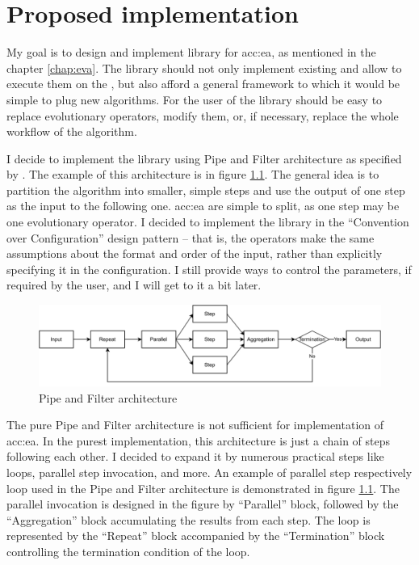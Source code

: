 \chapter{Proposed implementation}
\label{chap:impl}

My goal is to design and implement library for \acrlong{acc:ea}, as mentioned in the chapter \ref{chap:eva}. The library should not only implement existing  and allow to execute them on the \gpuns, but also afford a general framework to which it would be simple to plug new algorithms. For the user of the library should be easy to replace evolutionary operators, modify them, or, if necessary, replace the whole workflow of the algorithm.

I decide to implement the library using Pipe and Filter architecture as specified by \citet{EnterpriseIntegrationPatterns}. The example of this architecture is in figure \ref{fig:pipesandfilters}. The general idea is to partition the algorithm into smaller, simple steps and use the output of one step as the input to the following one. \acrshort{acc:ea} are simple to split, as one step may be one evolutionary operator. I decided to implement the library in the \enquote{Convention over Configuration} design pattern -- that is, the operators make the same assumptions about the format and order of the input, rather than explicitly specifying it in the configuration. I still provide ways to control the parameters, if required by the user, and I will get to it a bit later.

\begin{figure}
    \centering
    \includegraphics[width=\textwidth]{img/PipesAndFilters.pdf}
    \caption{Pipe and Filter architecture}
    \label{fig:pipesandfilters}
\end{figure}

The pure Pipe and Filter architecture is not sufficient for implementation of \acrshort{acc:ea}. In the purest implementation, this architecture is just a chain of steps following each other. I decided to expand it by numerous practical steps like loops, parallel step invocation, and more. An example of parallel step respectively loop used in the Pipe and Filter architecture is demonstrated in figure \ref{fig:pipesandfilters}. The parallel invocation is designed in the figure by \enquote{Parallel} block, followed by the \enquote{Aggregation} block accumulating the results from each step. The loop is represented by the \enquote{Repeat} block accompanied by the \enquote{Termination} block controlling the termination condition of the loop.

